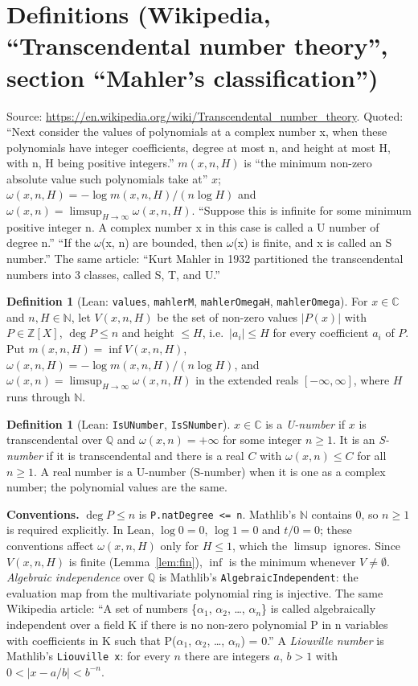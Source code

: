 \documentclass[11pt]{article}
\theoremstyle{definition}
\newtheorem{definition}[theorem]{Definition}
\begin{document}
\section{Definitions (Wikipedia, ``Transcendental number theory'', section ``Mahler's
classification'')}

Source: \url{https://en.wikipedia.org/wiki/Transcendental_number_theory}. Quoted:
``Next consider the values of polynomials at a complex number x, when these polynomials have
integer coefficients, degree at most n, and height at most H, with n, H being positive
integers.'' $m(x,n,H)$ is ``the minimum non-zero absolute value such polynomials take at'' $x$;
$\omega(x,n,H)=-\log m(x,n,H)/(n\log H)$ and $\omega(x,n)=\limsup_{H\to\infty}\omega(x,n,H)$.
``Suppose this is infinite for some minimum positive integer n. A complex number x in this case
is called a U number of degree n.'' ``If the $\omega$(x, n) are bounded, then $\omega$(x) is
finite, and x is called an S number.'' The same article: ``Kurt Mahler in 1932 partitioned the
transcendental numbers into 3 classes, called S, T, and U.''

\begin{definition}[Lean: \texttt{values}, \texttt{mahlerM}, \texttt{mahlerOmegaH},
\texttt{mahlerOmega}]
For $x\in\mathbb C$ and $n,H\in\mathbb N$, let $V(x,n,H)$ be the set of non-zero values
$|P(x)|$ with $P\in\mathbb Z[X]$, $\deg P\le n$ and height $\le H$, i.e.\ $|a_i|\le H$ for
every coefficient $a_i$ of $P$. Put $m(x,n,H)=\inf V(x,n,H)$,
$\omega(x,n,H)=-\log m(x,n,H)/(n\log H)$, and
$\omega(x,n)=\limsup_{H\to\infty}\omega(x,n,H)$ in the extended reals
$[-\infty,\infty]$, where $H$ runs through $\mathbb N$.
\end{definition}

\begin{definition}[Lean: \texttt{IsUNumber}, \texttt{IsSNumber}]
$x\in\mathbb C$ is a \emph{U-number} if $x$ is transcendental over $\mathbb Q$ and
$\omega(x,n)=+\infty$ for some integer $n\ge1$. It is an \emph{S-number} if it is
transcendental and there is a real $C$ with $\omega(x,n)\le C$ for all $n\ge1$. A real number
is a U-number (S-number) when it is one as a complex number; the polynomial values are the same.
\end{definition}

\textbf{Conventions.} $\deg P\le n$ is \texttt{P.natDegree <= n}. Mathlib's $\mathbb N$
contains $0$, so $n\ge1$ is required explicitly. In Lean, $\log 0=0$, $\log 1=0$ and $t/0=0$;
these conventions affect $\omega(x,n,H)$ only for $H\le1$, which the $\limsup$ ignores. Since
$V(x,n,H)$ is finite (Lemma~\ref{lem:fin}), $\inf$ is the minimum whenever $V\ne\emptyset$.
\emph{Algebraic independence} over $\mathbb Q$ is Mathlib's \texttt{AlgebraicIndependent}: the
evaluation map from the multivariate polynomial ring is injective. The same Wikipedia article:
``A set of numbers \{$\alpha_1$, $\alpha_2$, \ldots, $\alpha_n$\} is called algebraically
independent over a field K if there is no non-zero polynomial P in n variables with coefficients
in K such that P($\alpha_1$, $\alpha_2$, \ldots, $\alpha_n$) = 0.'' A \emph{Liouville number}
is Mathlib's \texttt{Liouville x}: for every $n$ there are integers $a$, $b>1$ with
$0<|x-a/b|<b^{-n}$.
\end{document}
